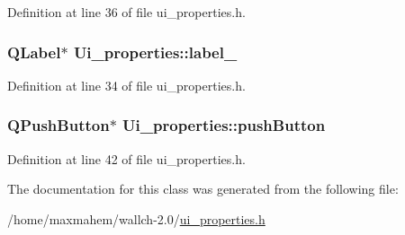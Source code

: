 Definition at line 36 of file ui\_\-properties.h.

\hypertarget{classUi__properties_acc7d3274c77af03c936c343605939957}{
\subsubsection[{label\_\-7}]{\setlength{\rightskip}{0pt plus 5cm}QLabel$\ast$ {\bf Ui\_\-properties::label\_}}}
\label{classUi__properties_acc7d3274c77af03c936c343605939957}


Definition at line 34 of file ui\_\-properties.h.

\hypertarget{classUi__properties_aaecc391d7033c644061cb6f1bf380bd2}{
\subsubsection[{pushButton}]{\setlength{\rightskip}{0pt plus 5cm}QPushButton$\ast$ {\bf Ui\_\-properties::pushButton}}}
\label{classUi__properties_aaecc391d7033c644061cb6f1bf380bd2}


Definition at line 42 of file ui\_\-properties.h.



The documentation for this class was generated from the following file:\begin{DoxyCompactItemize}
\item 
/home/maxmahem/wallch-\/2.0/\hyperlink{ui__properties_8h}{ui\_\-properties.h}\end{DoxyCompactItemize}
